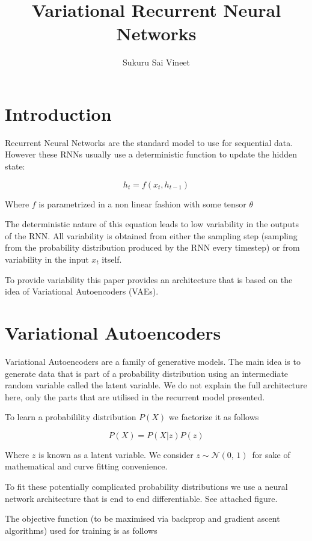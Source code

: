 \documentclass{article}
\title{Variational Recurrent Neural Networks}
\author{Sukuru Sai Vineet}
\begin{document}
\maketitle

\section{Introduction}
Recurrent Neural Networks are the standard model to use for sequential data. However these RNNs usually use a deterministic function to update the hidden state:

\[ h_{t} =f (x_{t}, h_{t - 1}) \]

Where $ f $ is parametrized in a non linear fashion with some tensor $ \theta $

The deterministic nature of this equation leads to low variability in the outputs of the RNN. All variability is obtained from either the sampling step (sampling from the probability distribution produced by the RNN every timestep) or from variability in the input $ x_t $ itself.

To provide variability this paper provides an architecture that is based on the idea of Variational Autoencoders (VAEs).

\section{Variational Autoencoders}

Variational Autoencoders are a family of generative models. The main idea is to generate data that is part
of a probability distribution using an intermediate random variable called the latent variable. We do not explain the full architecture here, only the parts that are utilised in the recurrent model presented.

To learn a probabilility distribution $ P(X) $ we factorize it as follows

\begin{equation*}
    P(X) = P(X|z)P(z)
\end{equation*}

Where $ z $ is known as a latent variable. We consider $ z \sim \mathcal{N}(0,\,1)\, $ for sake of mathematical and curve fitting convenience.

To fit these potentially complicated probability distributions we use a neural network architecture that is end to end differentiable. See attached figure.

The objective function (to be maximised via backprop and gradient ascent algorithms) used for training is as follows
\end{document}
